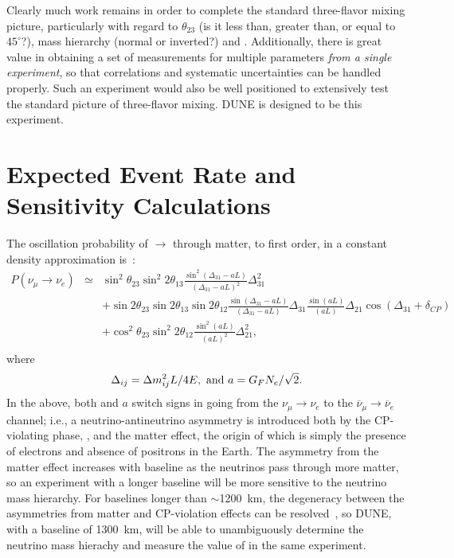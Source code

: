 Clearly much work remains in order to complete the standard three-flavor 
mixing picture, particularly 
with regard to $\theta_{23}$ (is it less than, greater than, or equal
to $45^\circ$?), mass hierarchy (normal or inverted?) 
and \deltacp.
Additionally, there is 
great value in obtaining a set of measurements for multiple parameters 
\emph{from a single experiment}, so that correlations and systematic 
uncertainties can be handled properly.  Such an experiment would also be 
well positioned to extensively test the standard picture of three-flavor mixing.  
DUNE is designed to be this experiment.

\section{Expected Event Rate and Sensitivity Calculations}
\label{sec:physics-lbnosc-senscalc}

The oscillation probability of \numu $\rightarrow$ \nue through matter, 
to first order, in a constant density
approximation is~\cite{Nunokawa:2007qh}:
%
\begin{eqnarray}
\label{eq:oscprob}
P(\nu_\mu \rightarrow \nu_e) & \simeq & \sin^2 \theta_{23} \sin^2 2 \theta_{13} 
\frac{ \sin^2(\Delta_{31} - aL)}{(\Delta_{31}-aL)^2} \Delta_{31}^2\\ \nonumber
& & + \sin 2 \theta_{23} \sin 2 \theta_{13} \sin 2 \theta_{12} \frac{ \sin(\Delta_{31} - aL)}{(\Delta_{31}-aL)} \Delta_{31} \frac{\sin(aL)}{(aL)} \Delta_{21} \cos (\Delta_{31} + \delta_{CP})\\ \nonumber
& & + \cos^2 \theta_{23} \sin^2 2 \theta_{12} \frac {\sin^2(aL)}{(aL)^2} \Delta_{21}^2, \\ \nonumber
\end{eqnarray}
%
where 
  \[ \Delta_{ij} = \Delta m^2_{ij} L/4E,\ {\rm and} \ a=G_F N_e /\sqrt{2}. \]
%
In the above, both \deltacp and $a$ 
switch signs in going from the
$\nu_\mu \to \nu_e$ to the $\overline{\nu}_\mu \to \overline{\nu}_e$ channel; i.e.,
a neutrino-antineutrino asymmetry is introduced both by the CP-violating
phase, \deltacp, and the matter effect, the origin of which 
is simply the presence of electrons and absence of positrons in the Earth.  
The asymmetry from the matter effect increases with baseline as the neutrinos
pass through more matter, so an experiment with a longer baseline will be
more sensitive to the neutrino mass hierarchy. For baselines longer than 
$\sim$1200~km, the degeneracy between the asymmetries from matter
and CP-violation effects can be resolved~\cite{Bass:2013vcg}, so DUNE, with a baseline of 1300~km, 
will be able to unambiguously
determine the neutrino mass hierachy and measure the value of \deltacp in the same experiment.

